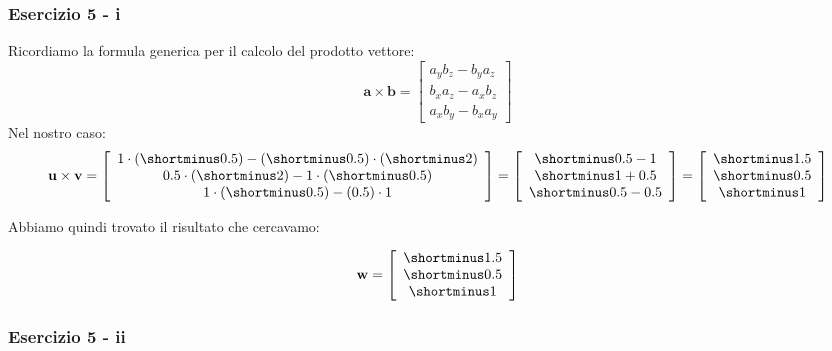 \documentclass{beamer}
\newcommand{\fig}{figures} %
\begin{document}
\begin{frame}
\frametitle{Esercizio 5 - i}
Ricordiamo la formula generica per il calcolo del prodotto vettore:
\begin{displaymath}
\mathbf a \times \mathbf b = 
\left[ \begin{array}{c} a_y b_z - b_y a_z \\ b_x a_z - a_x b_z \\ a_x b_y - b_x a_y \end{array} \right]
\end{displaymath}
Nel nostro caso:
\begin{displaymath}
\mathbf u \times \mathbf v = 
    \left[ \begin{array}{c} 
        1 \cdot (\shortminus 0.5) - (\shortminus 0.5) \cdot (\shortminus 2) \\
        0.5 \cdot (\shortminus 2) - 1 \cdot (\shortminus 0.5) \\
        1 \cdot (\shortminus 0.5) - (0.5) \cdot 1
    \end{array} \right]
=
    \left[ \begin{array}{c} 
        \shortminus 0.5 - 1 \\
        \shortminus 1 + 0.5 \\
        \shortminus 0.5 - 0.5
    \end{array} \right]
=
    \left[ \begin{array}{c} 
        \shortminus 1.5 \\
        \shortminus 0.5 \\
        \shortminus 1
    \end{array} \right]
\end{displaymath}

Abbiamo quindi trovato il risultato che cercavamo:

\begin{displaymath}
\mathbf w = 
    \left[ \begin{array}{c} 
        \shortminus 1.5 \\
        \shortminus 0.5 \\
        \shortminus 1
    \end{array} \right]
\end{displaymath}

\vspace{0.5cm}

\end{frame}

\begin{frame}
\frametitle{Esercizio 5 - ii}
\begin{center}
\end{center}
\end{frame}
\end{document}
